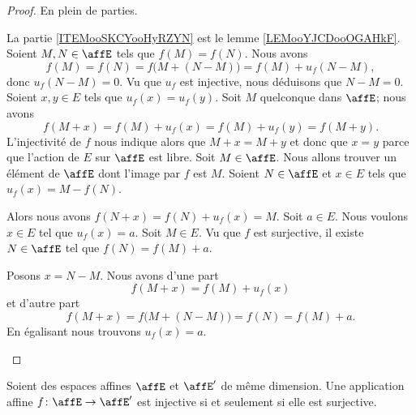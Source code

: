 \begin{proof}
	En plein de parties.
	\begin{subproof}

		La partie \ref{ITEMooSKCYooHyRZYN} est le lemme \ref{LEMooYJCDooOGAHkF}.
		Soient \( M,N\in\affE\) tels que \( f(M)=f(N)\). Nous avons
		\begin{equation}
			f(M)=f(N)=f\big( M+(N-M) \big)=f(M)+u_f(N-M),
		\end{equation}
		donc \( u_f(N-M)=0\). Vu que \( u_f\) est injective, nous déduisons que \( N-M=0\).
		Soient \( x,y\in E\) tels que \( u_f(x)=u_f(y)\). Soit \( M\) quelconque dans \( \affE\); nous avons
		\begin{equation}
			f(M+x)=f(M)+u_f(x)=f(M)+u_f(y)=f(M+y).
		\end{equation}
		L'injectivité de \( f\) nous indique alors que \( M+x=M+y\) et donc que \( x=y\) parce que l'action de \( E\) sur \( \affE\) est libre.
		Soit \( M\in \affE\). Nous allons trouver un élément de \( \affE\) dont l'image par \( f\) est \( M\). Soient \( N\in\affE\) et \( x\in E\) tels que \( u_f(x)=M-f(N)\).

		Alors nous avons \( f(N+x)=f(N)+u_f(x)=M\).
		Soit \( a\in E\). Nous voulons \( x\in E\) tel que \( u_f(x)=a\). Soit \( M\in E\). Vu que \( f\) est surjective, il existe \( N\in \affE\) tel que \( f(N)=f(M)+a\).

		Posons \( x=N-M\). Nous avons d'une part
		\begin{equation}
			f(M+x)=f(M)+u_f(x)
		\end{equation}
		et d'autre part
		\begin{equation}
			f(M+x)=f\big( M+(N-M) \big)=f(N)=f(M)+a.
		\end{equation}
		En égalisant nous trouvons \( u_f(x)=a\).
	\end{subproof}
\end{proof}

\begin{proposition}
	Soient des espaces affines \( \affE\) et \( \affE'\) de même dimension. Une application affine \( f\colon \affE\to \affE'\) est injective si et seulement si elle est surjective.
\end{proposition}

